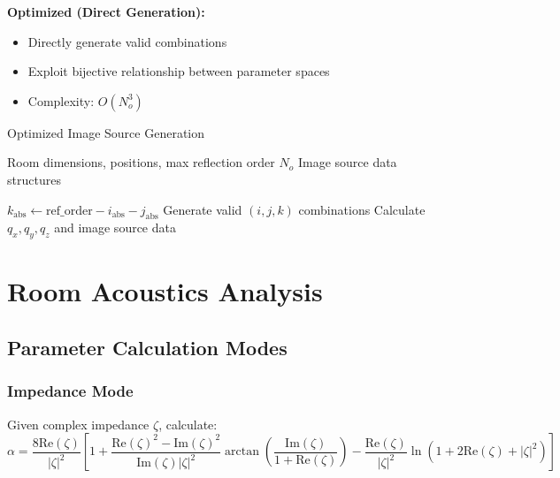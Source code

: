 \documentclass[11pt,a4paper]{article}
\begin{document}
\textbf{Optimized (Direct Generation):}
\begin{itemize}
    \item Directly generate valid combinations
    \item Exploit bijective relationship between parameter spaces
    \item Complexity: $O(N_o^3)$
\end{itemize}

\begin{algorithm}[H]
\caption{Optimized Image Source Generation}
\begin{algorithmic}[1]
\Require Room dimensions, positions, max reflection order $N_o$
\Ensure Image source data structures

                \State $k_{\text{abs}} \leftarrow \text{ref\_order} - i_{\text{abs}} - j_{\text{abs}}$
                \State Generate valid $(i,j,k)$ combinations
                        \State Calculate $q_x, q_y, q_z$ and image source data
                    \EndIf
                \EndFor
            \EndFor
        \EndFor
    \EndFor
\EndFor
\end{algorithmic}
\end{algorithm}

\section{Room Acoustics Analysis}

\subsection{Parameter Calculation Modes}

\subsubsection{Impedance Mode}
Given complex impedance $\zeta$, calculate:
\begin{equation}
\alpha = \frac{8 \text{Re}(\zeta)}{|\zeta|^2} \left[1 + \frac{\text{Re}(\zeta)^2 - \text{Im}(\zeta)^2}{\text{Im}(\zeta)|\zeta|^2} \arctan\left(\frac{\text{Im}(\zeta)}{1 + \text{Re}(\zeta)}\right) - \frac{\text{Re}(\zeta)}{|\zeta|^2} \ln(1 + 2\text{Re}(\zeta) + |\zeta|^2)\right]
\end{equation}
\end{document}
